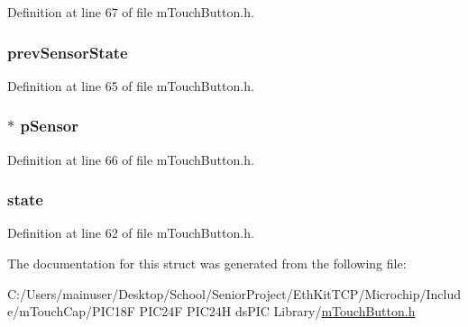 Definition at line 67 of file m\+Touch\+Button.\+h.

\hypertarget{structtag___m_t_o_u_c_h_b_u_t_t_o_n_ae404837b36327a7f5dc7ec0945a80d8e}{}
\subsubsection[{prev\+Sensor\+State}]{ prev\+Sensor\+State}\label{structtag___m_t_o_u_c_h_b_u_t_t_o_n_ae404837b36327a7f5dc7ec0945a80d8e}


Definition at line 65 of file m\+Touch\+Button.\+h.

\hypertarget{structtag___m_t_o_u_c_h_b_u_t_t_o_n_a45185229b3c515672f69beb8d814b38c}{}
\subsubsection[{p\+Sensor}]{$\ast$ p\+Sensor}\label{structtag___m_t_o_u_c_h_b_u_t_t_o_n_a45185229b3c515672f69beb8d814b38c}


Definition at line 66 of file m\+Touch\+Button.\+h.

\hypertarget{structtag___m_t_o_u_c_h_b_u_t_t_o_n_a6e9c4cbd32a1178b12f3a61f6855c896}{}
\subsubsection[{state}]{ state}\label{structtag___m_t_o_u_c_h_b_u_t_t_o_n_a6e9c4cbd32a1178b12f3a61f6855c896}


Definition at line 62 of file m\+Touch\+Button.\+h.



The documentation for this struct was generated from the following file\+:\begin{DoxyCompactItemize}
\item 
C\+:/\+Users/mainuser/\+Desktop/\+School/\+Senior\+Project/\+Eth\+Kit\+T\+C\+P/\+Microchip/\+Include/m\+Touch\+Cap/\+P\+I\+C18\+F P\+I\+C24\+F P\+I\+C24\+H ds\+P\+I\+C Library/\hyperlink{m_touch_button_8h}{m\+Touch\+Button.\+h}\end{DoxyCompactItemize}
